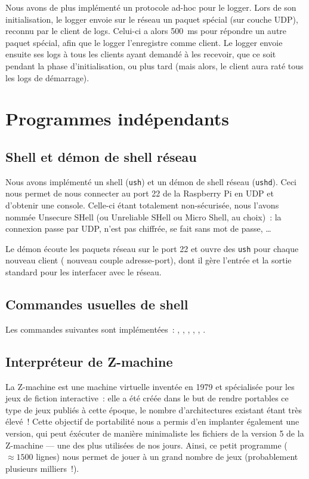 \documentclass[11pt,a4paper]{article}
\newcommand{\fname}[1]{\texttt{#1}} %
\begin{document}
Nous avons de plus implémenté un protocole ad-hoc pour le logger.
Lors de son initialisation, le logger envoie sur le réseau un paquet spécial
(sur couche UDP), reconnu par le client de logs. Celui-ci a alors 500\ ms pour
répondre un autre paquet spécial, afin que le logger l'enregistre comme
client. Le logger envoie ensuite ses logs à tous les clients ayant demandé à
les recevoir, que ce soit pendant la phase d'initialisation, ou plus tard
(mais alors, le client aura raté tous les logs de démarrage).

\section{Programmes indépendants}

\subsection{Shell et démon de shell réseau}
Nous avons implémenté un shell (\fname{ush}) et un démon de shell réseau
(\fname{ushd}). Ceci nous permet de nous connecter au port 22 de la
Raspberry Pi en UDP et d'obtenir une console. Celle-ci étant totalement
non-sécurisée, nous l'avons nommée Unsecure SHell (ou Unreliable SHell ou
Micro Shell, au choix)~: la connexion passe par UDP,
n'est pas chiffrée, se fait sans mot de passe, \ldots

Le démon écoute les paquets réseau sur le port 22 et ouvre des \fname{ush}
pour chaque nouveau client (\ie{} nouveau couple adresse-port), dont il gère
l'entrée et la sortie standard pour les interfacer avec le réseau.

\subsection{Commandes usuelles de shell}
Les commandes suivantes sont implémentées~:
, , , , , .

\subsection{Interpréteur de Z-machine}
La Z-machine est une machine virtuelle inventée en 1979 et spécialisée
pour les jeux de fiction interactive~: elle a été créée dans le but de
rendre portables ce type de jeux publiés à cette époque, le nombre
d'architectures existant étant très élevé~! Cette objectif de
portabilité nous a permis d'en implanter également une version, qui
peut éxécuter de manière minimaliste les fichiers de la version 5 de
la Z-machine --- une des plus utilisées de nos jours. Ainsi, ce petit
programme ($\approx 1500$ lignes) nous permet de jouer à un grand
nombre de jeux (probablement plusieurs milliers~!).
\end{document}
